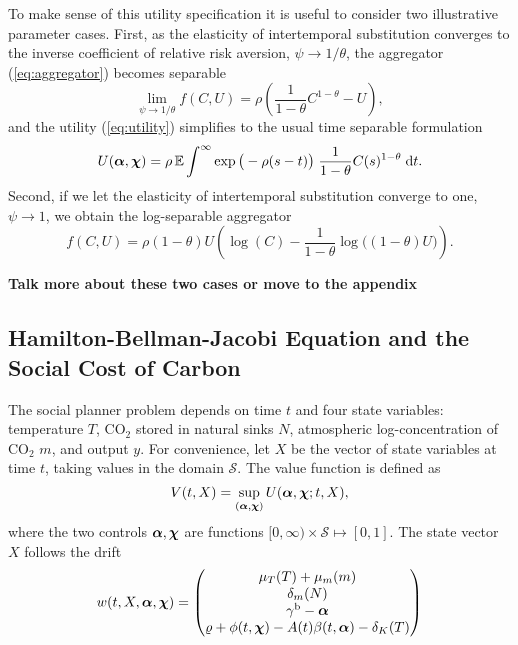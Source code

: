 \documentclass[../../main.tex]{subfiles}
\begin{document}
To make sense of this utility specification it is useful to consider two illustrative parameter cases. First, as the elasticity of intertemporal substitution converges to the inverse  coefficient of relative risk aversion, $\psi \to 1 / \theta$, the aggregator (\ref{eq:aggregator}) becomes separable \begin{equation}
    \lim_{\psi \to 1 / \theta} f(C, U) = \rho \left(\frac{1}{1 - \theta} C^{1 - \theta} - U\right),
\end{equation} and the utility (\ref{eq:utility}) simplifies to the usual time separable formulation \begin{equation}
    U(\bm{\alpha}, \bm{\chi}) = \rho\operatorname{\mathbb{E}} \int^{\infty} \exp\big(-\rho (s - t) \big) \; \frac{1}{1 - \theta} C(s)^{1 - \theta} \; \mathrm{d}t.
\end{equation} Second, if we let the elasticity of intertemporal substitution converge to one, $\psi \to 1$, we obtain the log-separable aggregator \begin{equation}
    f(C, U) = \rho (1 - \theta)U \left(\log(C) - \frac{1}{1 - \theta} \log\big( (1 - \theta) U \big) \right).
\end{equation}

\textbf{Talk more about these two cases or move to the appendix}

\subsection{Hamilton-Bellman-Jacobi Equation and the Social Cost of Carbon}

The social planner problem depends on time $t$ and four state variables: temperature $T$, CO$_2$ stored in natural sinks $N$, atmospheric log-concentration of CO$_2$ $m$, and output $y$. For convenience, let $X$ be the vector of state variables at time $t$, taking values in the domain $\mathcal{S}$. The value function is defined as \begin{equation}
    V(t, X) = \sup_{(\bm{\alpha}, \bm{\chi})} U(\bm{\alpha}, \bm{\chi}; t, X),
\end{equation} where the two controls $\bm{\alpha}, \bm{\chi}$ are functions $[0, \infty) \times \mathcal{S} \mapsto [0, 1]$. The state vector $X$ follows the drift \begin{equation}
    w(t, X, \bm{\alpha}, \bm{\chi}) = \begin{pmatrix}
        \mu_T(T) + \mu_m(m) \\
        \delta_m(N) \\
        \gamma^{\mathrm{b}} - \bm{\alpha} \\
        \varrho + \phi(t, \bm{\chi}) - A(t) \beta(t, \bm{\alpha}) - \delta_K(T)
    \end{pmatrix}
\end{equation}
\end{document}
